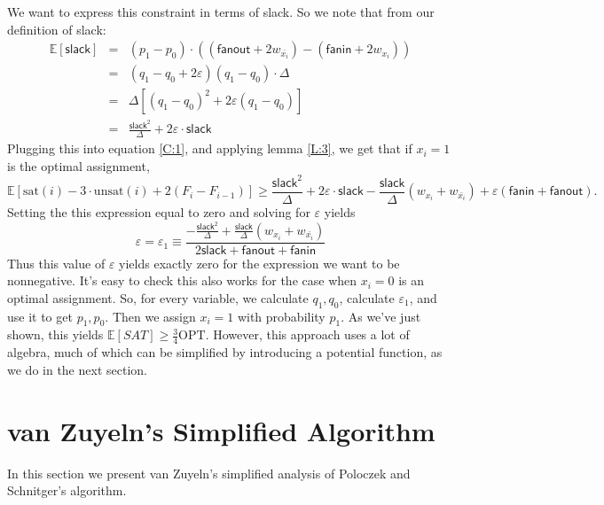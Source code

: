 \documentclass[11pt,letter]{article}
\numberwithin{theorem}{section}
\renewcommand{\epsilon}{\varepsilon}
\begin{document}
We want to express this constraint in terms of slack. So we note that from our definition of slack:
\begin{eqnarray*}
\mathbb{E}[\mathsf{slack}] &=& (p_1-p_0)\cdot ((\mathsf{fanout} + 2w_{\bar{x_i}}) -(\mathsf{fanin} + 2w_{x_i}))
\\&=& (q_1-q_0+2\epsilon)(q_1-q_0)\cdot\Delta
\\&=& \Delta[(q_1-q_0)^2 + 2\varepsilon(q_1-q_0)]
\\&=& \frac{\mathsf{slack}^2}{\Delta} +2\varepsilon\cdot\mathsf{slack}
\end{eqnarray*}
Plugging this into equation \ref{C:1}, and applying lemma \ref{L:3}, we get that if $x_i =1$ is the optimal assignment,
\[\mathbb{E}[\textrm{sat}(i) - 3\cdot\textrm{unsat}(i)+ 2(F_{i}-F_{i-1})] \ge \frac{\mathsf{slack}^2}{\Delta} +2\varepsilon\cdot\mathsf{slack} - \frac{\mathsf{slack}}{\Delta}(w_{x_i} + w_{\bar{x_i}}) + \varepsilon(\mathsf{fanin} + \mathsf{fanout}).\]
Setting the this expression equal to zero and solving for $\varepsilon$ yields
\begin{equation}
\varepsilon = \varepsilon_1 \equiv \frac{-\frac{\mathsf{slack}^2}{\Delta} + \frac{\mathsf{slack}}{\Delta}(w_{x_i} + w_{\bar{x_i}})}{2\mathsf{slack}+ \mathsf{fanout} + \mathsf{fanin}}
\end{equation}
Thus this value of $\varepsilon$ yields exactly zero for the expression we want to be nonnegative. It's easy to check this also works for the case when $x_i=0$ is an optimal assignment. So, for every variable, we calculate $q_1, q_0$, calculate $\varepsilon_1$, and use it to get $p_1, p_0$. Then we assign $x_i=1$ with probability $p_1$. As we've just shown, this yields $\mathbb{E}[SAT] \ge \frac{3}{4}\textrm{OPT}$. However, this approach uses a lot of algebra, much of which can be simplified by introducing a potential function, as we do in the next section.

\section{van Zuyeln's Simplified Algorithm}\label{S:vZ}

In this section we present van Zuyeln's simplified analysis of Poloczek and Schnitger's algorithm. 
\end{document}
